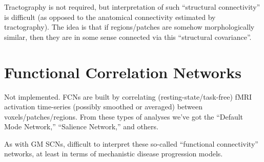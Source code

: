 \documentclass[12pt]{elsarticle}
\begin{document}
Tractography is not required, but interpretation of such ``structural connectivity'' is difficult (as opposed to the anatomical connectivity estimated by tractography). The idea is that if regions/patches are somehow morphologically similar, then they are in some sense connected via this ``structural covariance''.

\section*{Functional Correlation Networks}
Not implemented. FCNs are built by correlating (resting-state/task-free) fMRI activation time-series (possibly smoothed or averaged) between voxels/patches/regions. From these types of analyses we've got the ``Default Mode Network,'' ``Salience Network,'' and others. 

As with GM SCNs, difficult to interpret these so-called ``functional connectivity'' networks, at least in terms of mechanistic disease progression models.
\end{document}
